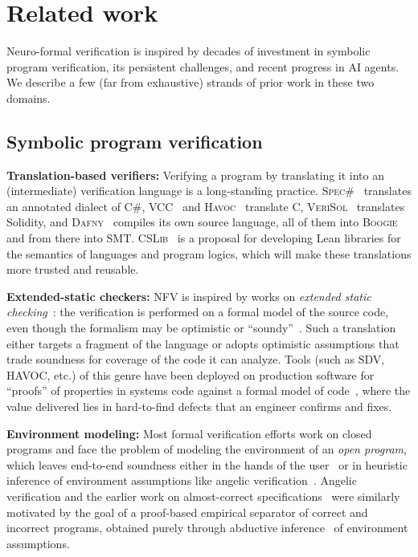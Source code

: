 \documentclass[11pt,letterpaper]{article}
\newcommand{\daf}{\textsc{Dafny}}
\newcommand{\boog}{\textsc{Boogie}}
\begin{document}
\section{Related work}
\label{sec:related}
Neuro-formal verification is inspired by decades of investment in symbolic
program verification, its persistent challenges, and recent progress in AI agents.
We describe a few (far from exhaustive) strands of prior work in these two domains.

\subsection{Symbolic program verification}
\textbf{Translation-based verifiers:} Verifying a program by translating it
into an (intermediate) verification language is a long-standing practice.
\textsc{Spec\#}~\cite{barnett2004specsharp} translates an
annotated dialect of C\#, \textsc{VCC}~\cite{cohen2009vcc} and \textsc{Havoc}~\cite{lahiri2008havoc}
translate C, \textsc{VeriSol}~\cite{wang2019verisol} translates
Solidity, and
\daf{}~\cite{leino2010dafny} compiles its own source language, all of them into
\boog{}~\cite{barnett2006boogie} and from there into SMT. 
\textsc{CSLib}~\cite{barrett2026cslib} is a proposal for developing Lean libraries for the semantics of
languages and program logics, which will make these translations more trusted and reusable.

\textbf{Extended-static checkers:} 
NFV is inspired by works on \emph{extended static checking}~\cite{flanagan2002escjava}: the
verification is performed on a formal model of the source code, even though the formalism may be 
optimistic or ``soundy''~\cite{livshits2015soundiness}.
Such a translation either targets a fragment of the language or adopts
optimistic assumptions that trade soundness for coverage of the code it can
analyze.
Tools (such as SDV, HAVOC, etc.) of this genre have been deployed on production software for
``proofs'' of properties in systems code against a formal model of code~\cite{vanegue2013audit,ball-vstte12,ball2011slam,lal2012corral},
where the value delivered lies in hard-to-find defects that an engineer confirms and fixes.

\textbf{Environment modeling:} 
Most formal verification efforts work on closed programs and face the problem of modeling the 
environment of an \emph{open program}, which leaves end-to-end soundness either in the hands of the
user~\cite{priya2024envassume} or in heuristic inference of environment assumptions like angelic 
verification~\cite{das2015angelic,lahiri2020angelic}.
Angelic verification and the earlier work on almost-correct
specifications~\cite{blackshear2013acs} were similarly motivated by the goal of
a proof-based empirical separator of correct and incorrect programs, obtained
purely through abductive inference~\cite{dillig2012abduction} of environment
assumptions.
\end{document}
